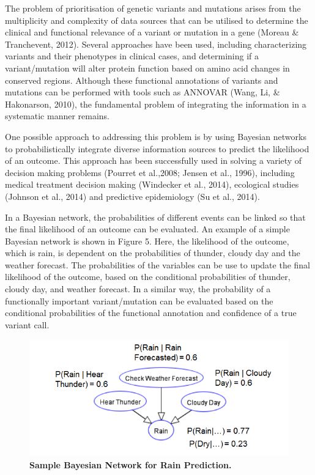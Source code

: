 \documentclass{article}
\begin{document}
 The problem of prioritisation of genetic variants and mutations arises from the multiplicity and complexity of data sources that can be utilised to determine the clinical and functional relevance of a variant or mutation in a gene (Moreau \& Tranchevent, 2012). Several approaches have been used, including characterizing variants and their phenotypes in clinical cases, and determining if a variant/mutation will alter protein function based on amino acid changes in conserved regions. Although these functional annotations of variants and mutations can be performed with tools such as ANNOVAR (Wang, Li, \& Hakonarson, 2010), the fundamental problem of integrating the information in a systematic manner remains. 
 
 One possible approach to addressing this problem is by using Bayesian networks to probabilistically integrate diverse information sources to predict the likelihood of an outcome. This approach has been successfully used in solving a variety of decision making problems (Pourret et al.,2008; Jensen et al., 1996), including medical treatment decision making (Windecker et al., 2014), ecological studies (Johnson et al., 2014) and predictive epidemiology (Su et al., 2014).
 
 In a Bayesian network, the probabilities of different events can be linked so that the final likelihood of an outcome can be evaluated. An example of a simple Bayesian network is shown in Figure 5. Here, the likelihood of the outcome, which is rain, is dependent on the probabilities of thunder, cloudy day and the weather forecast. The probabilities of the variables can be use to update the final likelihood of the outcome, based on the conditional probabilities of thunder, cloudy day, and weather forecast. In a similar way, the probability of a functionally important variant/mutation can be evaluated based on the conditional probabilities of the functional annotation and confidence of a true variant call.
 
\begin{figure}[H]
\centering
\includegraphics{samplebayesiannetwork.png}
\caption{\textbf{Sample Bayesian Network for Rain Prediction.}}
\end{figure}
\end{document}
